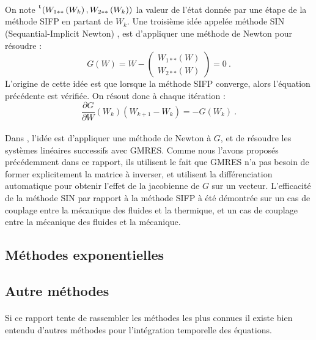     \paragraph{}
    On note $\mskip1mu\prescript{\smash{\mathrm t\mkern-3mu}}{}{\mathstrut\left(W_{1**}\left(W_k\right), W_{2**}\left(W_k\right)\right)}$ la valeur de l'état donnée par une étape de la méthode SIFP en partant de $W_k$.
    Une troisième idée appelée méthode SIN (Sequantial-Implicit Newton) \cite{WongKwokHorneEtAl2019}, est d'appliquer une méthode de Newton pour résoudre :
    \[G\left(W\right) = W - \begin{pmatrix}W_{1**}\left(W\right) \\ W_{2**}\left(W\right)\end{pmatrix} = 0\ .\]
    L'origine de cette idée est que lorsque la méthode SIFP converge, alors l'équation précédente est vérifiée.
    On résout donc à chaque itération :
    \[\frac{\partial G}{\partial W}\left(W_k\right)\left(W_{k+1} - W_k\right) = -G\left(W_k\right)\ .\]

    \paragraph{}
    Dans \cite{WongKwokHorneEtAl2019}, l'idée est d'appliquer une méthode de Newton à $G$, et de résoudre les systèmes linéaires successifs avec GMRES.
    Comme nous l'avons proposés précédemment dans ce rapport, ils utilisent le fait que GMRES n'a pas besoin de former explicitement la matrice à inverser, et utilisent la différenciation automatique pour obtenir l'effet de la jacobienne de $G$ sur un vecteur.
    L'efficacité de la méthode SIN par rapport à la méthode SIFP à été démontrée sur un cas de couplage entre la mécanique des fluides et la thermique, et un cas de couplage entre la mécanique des fluides et la mécanique.


  \subsection{Méthodes exponentielles}


  \subsection{Autre méthodes}

    \paragraph{}
    Si ce rapport tente de rassembler les méthodes les plus connues il existe bien entendu d'autres méthodes pour l'intégration temporelle des équations.

